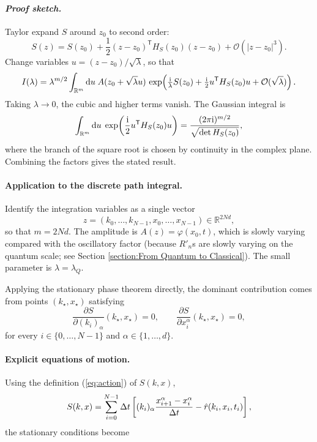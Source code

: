 \documentclass{book}
\newcommand{\mathd}{\mathrm{d}}
\newcommand{\mathi}{\mathrm{i}}
\newcommand{\mathpi}{\pi}
\newcommand{\tmem}[1]{{\em #1\/}}
\begin{document}
\paragraph{{\tmem{Proof sketch.}}} Taylor expand $S$ around $z_0$ to second
order:
\[ S (z) = S (z_0) + \frac{1}{2}  (z - z_0)^{\mathsf{T}} H_S (z_0)  (z - z_0)
   +\mathcal{O} (|z - z_0 |^3) . \]
Change variables $u = (z - z_0) / \sqrt{\lambda}$, so that
\[ I (\lambda) = \lambda^{m / 2}  \int_{\mathbb{R}^m} \mathd u \hspace{0.27em}
   A (z_0 + \sqrt{\lambda} u)  \hspace{0.17em} \exp \hspace{-0.17em} \left(
   \tfrac{\mathi}{\lambda} S (z_0) + \tfrac{\mathi}{2} u^{\mathsf{T}} H_S
   (z_0) u +\mathcal{O}(\sqrt{\lambda}) \right) . \]
Taking $\lambda \to 0$, the cubic and higher terms vanish. The Gaussian
integral is
\[ \int_{\mathbb{R}^m} \mathd u \hspace{0.27em} \exp \hspace{-0.17em} \left(
   \frac{\mathi}{2} u^{\mathsf{T}} H_S (z_0) u \right) = \frac{(2 \mathpi
   \mathi)^{m / 2}}{\sqrt{\det H_S (z_0)}}, \]
where the branch of the square root is chosen by continuity in the complex
plane. Combining the factors gives the stated result.

\paragraph{Application to the discrete path integral.} Identify the
integration variables as a single vector
\[ z = (k_0, \ldots, k_{N - 1}, x_0, \ldots, x_{N - 1}) \in \mathbb{R}^{2 Nd},
\]
so that $m = 2 Nd$. The amplitude is $A (z) = \varphi (x_0, t)$, which is
slowly varying compared with the oscillatory factor (because $R'_n$s are
slowly varying on the quantum scale; see Section \ref{section:From Quantum to
Classical}). The small parameter is $\lambda = \lambda_Q$.

Applying the stationary phase theorem directly, the dominant contribution
comes from points $(k_{\star}, x_{\star})$ satisfying
\[ \frac{\partial S}{\partial (k_i)_{\alpha}}  (k_{\star}, x_{\star}) = 0,
   \qquad \frac{\partial S}{\partial x_i^{\alpha}}  (k_{\star}, x_{\star}) =
   0, \]
for every $i \in \{0, \ldots, N - 1\}$ and $\alpha \in \{1, \ldots, d\}$.

\paragraph{Explicit equations of motion.} Using the definition
(\ref{eq:action}) of $S (k, x)$,
\[ S (k, x) = \sum_{i = 0}^{N - 1} \Delta t \left[ (k_i)_{\alpha} \frac{x_{i +
   1}^{\alpha} - x_i^{\alpha}}{\Delta t} - {\color[HTML]{000000}\hat{r} (k_i,
   x_i, t_i)} \right], \]
the stationary conditions become
\end{document}
